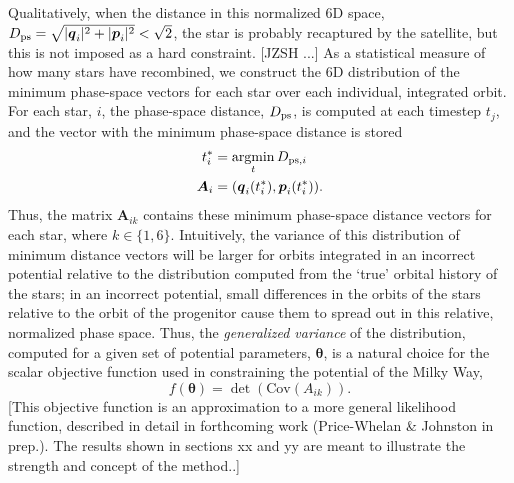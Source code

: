 \documentclass[preprint]{aastex}
\newcommand{\bs}{\boldsymbol}
\newcommand{\argmin}{\operatornamewithlimits{argmin}}
\begin{document}
Qualitatively, when the distance in this normalized 6D space,
$D_{\rm ps}=\sqrt{|\bs{q}_{i}|^2+|\bs{p}_{i}|^2} < \sqrt{2}$, the star is
probably recaptured by the satellite, but this is not imposed as a
hard constraint. [JZSH ...] As a statistical measure of how many stars have recombined, we
construct the 6D distribution of the minimum phase-space vectors for
each star over each individual, integrated orbit. For each star, $i$,
the phase-space distance, $D_{\rm ps}$, is computed at each timestep
$t_{j}$, and the vector with the minimum phase-space distance is stored
\begin{align}
  t^*_{i} &= \argmin_{t} D_{{\rm ps},i}\\
  \bs{A}_{i} &= (\bs{q}_{i}(t^*_{i}),\bs{p}_{i}(t^*_{i})).
\end{align}
Thus, the matrix $\bs{A}_{ik}$ contains these minimum phase-space distance vectors for each star,
where $k\in\{1,6\}$. Intuitively, the variance of this distribution of minimum distance vectors
will be larger for orbits integrated in an incorrect potential
relative to the distribution computed from the `true' orbital history
of the stars; in an incorrect potential, small differences in the
orbits of the stars relative to the orbit of the progenitor cause them
to spread out in this relative, normalized phase space. Thus, the
\emph{generalized variance} of the distribution, computed for a given
set of potential parameters, $\bs{\theta}$, is a natural choice for
the scalar objective function used in constraining the potential of
the Milky Way,
\begin{equation}
  f(\bs{\theta})=\det(\mathrm{Cov}(A_{ik})).
\end{equation}
[This objective function is an approximation to a more general likelihood function, described in detail in forthcoming work (Price-Whelan \& Johnston in prep.). The results shown in sections xx and yy are meant to illustrate the strength and concept of the method..]
\end{document}
